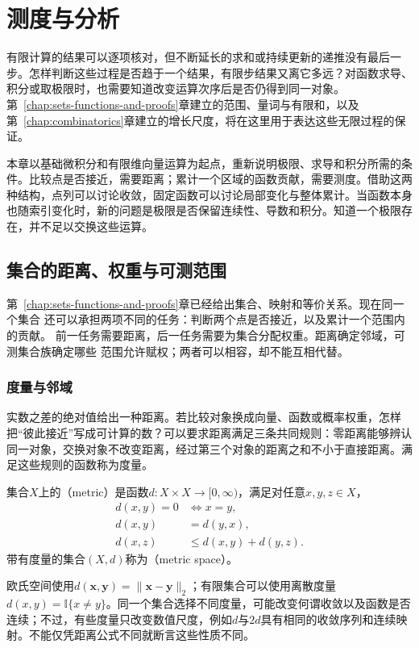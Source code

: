 \chapter{测度与分析}
\label{chap:mathematical-analysis}

有限计算的结果可以逐项核对，但不断延长的求和或持续更新的递推没有最后一步。怎样判断这些过程是否趋于一个结果，有限步结果又离它多远？对函数求导、积分或取极限时，也需要知道改变运算次序后是否仍得到同一对象。第~\ref{chap:sets-functions-and-proofs}章建立的范围、量词与有限和，以及第~\ref{chap:combinatorics}章建立的增长尺度，将在这里用于表达这些无限过程的保证。

本章以基础微积分和有限维向量运算为起点，重新说明极限、求导和积分所需的条件。比较点是否接近，需要距离；累计一个区域的函数贡献，需要测度。借助这两种结构，点列可以讨论收敛，固定函数可以讨论局部变化与整体累计。当函数本身也随索引变化时，新的问题是极限是否保留连续性、导数和积分。知道一个极限存在，并不足以交换这些运算。

\section{集合的距离、权重与可测范围}
\label{sec:analysis-set-structures}

第~\ref{chap:sets-functions-and-proofs}章已经给出集合、映射和等价关系。现在同一个集合
还可以承担两项不同的任务：判断两个点是否接近，以及累计一个范围内的贡献。
前一任务需要距离，后一任务需要为集合分配权重。距离确定邻域，可测集合族确定哪些
范围允许赋权；两者可以相容，却不能互相代替。

\subsection{度量与邻域}

实数之差的绝对值给出一种距离。若比较对象换成向量、函数或概率权重，怎样把“彼此接近”写成可计算的数？可以要求距离满足三条共同规则：零距离能够辨认同一对象，交换对象不改变距离，经过第三个对象的距离之和不小于直接距离。满足这些规则的函数称为度量。
\begin{definition}[度量与度量空间]
\label{def:analysis-metric-space}
集合$X$上的（metric）是函数$d:X\times X\to[0,\infty)$，满足对任意$x,y,z\in X$，
\[
  \begin{aligned}
    d(x,y)=0&\Longleftrightarrow x=y,\\
    d(x,y)&=d(y,x),\\
    d(x,z)&\leq d(x,y)+d(y,z).
  \end{aligned}
\]
带有度量的集合$(X,d)$称为（metric space）。
\end{definition}
欧氏空间使用$d(\bm{x},\bm{y})=\lVert\bm{x}-\bm{y}\rVert_2$；有限集合可以使用离散度量$d(x,y)=\mathbb{I}\{x\neq y\}$。同一个集合选择不同度量，可能改变何谓收敛以及函数是否连续；不过，有些度量只改变数值尺度，例如$d$与$2d$具有相同的收敛序列和连续映射。不能仅凭距离公式不同就断言这些性质不同。

